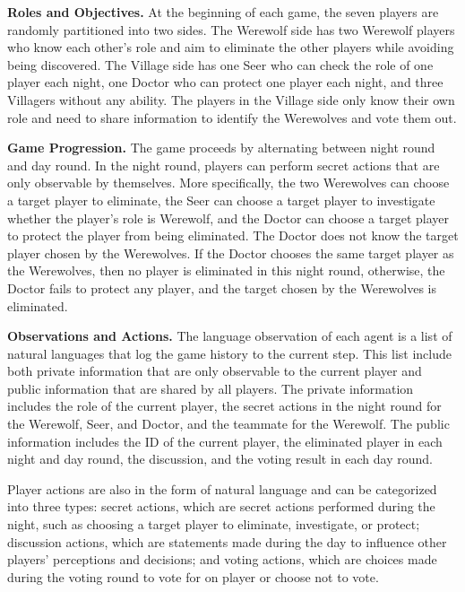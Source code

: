 \textbf{Roles and Objectives.} 
At the beginning of each game, the seven players are randomly partitioned into two sides. The Werewolf side has two Werewolf players who know each other's role and aim to eliminate the other players while avoiding being discovered. The Village side has one Seer who can check the role of one player each night, one Doctor who can protect one player each night, and three Villagers without any ability. The players in the Village side only know their own role and need to share information to identify the Werewolves and vote them out.


\textbf{Game Progression.} 
The game proceeds by alternating between night round and day round. In the night round, players can perform secret actions that are only observable by themselves. More specifically, the two Werewolves can choose a target player to eliminate, the Seer can choose a target player to investigate whether the player's role is Werewolf, and the Doctor can choose a target player to protect the player from being eliminated. The Doctor does not know the target player chosen by the Werewolves. If the Doctor chooses the same target player as the Werewolves, then no player is eliminated in this night round, otherwise, the Doctor fails to protect any player, and the target chosen by the Werewolves is eliminated.

\textbf{Observations and Actions.} 
The language observation of each agent is a list of natural languages that log the game history to the current step. This list include both private information that are only observable to the current player and public information that are shared by all players. The private information includes the role of the current player, the secret actions in the night round for the Werewolf, Seer, and Doctor, and the teammate for the Werewolf. The public information includes the ID of the current player, the eliminated player in each night and day round, the discussion, and the voting result in each day round. 

Player actions are also in the form of natural language and can be categorized into three types: secret actions, which are secret actions performed during the night, such as choosing a target player to eliminate, investigate, or protect; discussion actions, which are statements made during the day to influence other players' perceptions and decisions; and voting actions, which are choices made during the voting round to vote for on player or choose not to vote.


